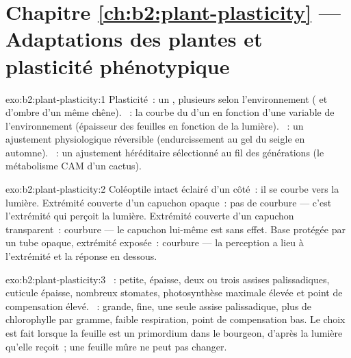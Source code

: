 \section*{Chapitre \ref{ch:b2:plant-plasticity} --- Adaptations des plantes et plasticité phénotypique}

\begin{solution}{exo:b2:plant-plasticity:1}
Plasticité~: un , plusieurs  selon l'environnement
( et d'ombre d'un même chêne). ~: la
courbe du  d'un  en fonction d'une variable de
l'environnement (épaisseur des feuilles en fonction de la lumière).
~: un ajustement physiologique réversible (endurcissement
au gel du seigle en automne). ~: un ajustement héréditaire
sélectionné au fil des générations (le métabolisme CAM d'un cactus).
\end{solution}

\begin{solution}{exo:b2:plant-plasticity:2}
Coléoptile intact éclairé d'un côté~: il se courbe vers la lumière.
Extrémité couverte d'un capuchon opaque~: pas de courbure --- c'est
l'extrémité qui perçoit la lumière. Extrémité couverte d'un capuchon
transparent~: courbure --- le capuchon lui-même est sans effet. Base
protégée par un tube opaque, extrémité exposée~: courbure --- la
perception a lieu à l'extrémité et la réponse en dessous.
\end{solution}

\begin{solution}{exo:b2:plant-plasticity:3}
~: petite, épaisse, deux ou trois assises
palissadiques, cuticule épaisse, nombreux stomates, photosynthèse
maximale élevée et point de compensation élevé. ~:
grande, fine, une seule assise palissadique, plus de chlorophylle par
gramme, faible respiration, point de compensation bas. Le choix est fait
lorsque la feuille est un primordium dans le bourgeon, d'après la
lumière qu'elle reçoit~; une feuille mûre ne peut pas changer.
\end{solution}

